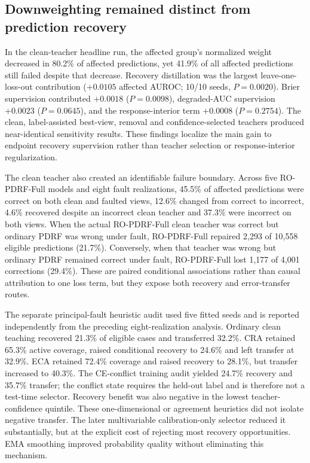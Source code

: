 \documentclass[11pt]{article}
\begin{document}
\subsection{Downweighting remained distinct from prediction recovery}

In the clean-teacher headline run, the affected group's normalized weight decreased in 80.2\% of affected predictions, yet 41.9\% of all affected predictions still failed despite that decrease. Recovery distillation was the largest leave-one-loss-out contribution ($+0.0105$ affected AUROC; 10/10 seeds, $P=0.0020$). Brier supervision contributed $+0.0018$ ($P=0.0098$), degraded-AUC supervision $+0.0023$ ($P=0.0645$), and the response-interior term $+0.0008$ ($P=0.2754$). The clean, label-assisted best-view, removal and confidence-selected teachers produced near-identical sensitivity results. These findings localize the main gain to endpoint recovery supervision rather than teacher selection or response-interior regularization.

The clean teacher also created an identifiable failure boundary. Across five RO-PDRF-Full models and eight fault realizations, 45.5\% of affected predictions were correct on both clean and faulted views, 12.6\% changed from correct to incorrect, 4.6\% recovered despite an incorrect clean teacher and 37.3\% were incorrect on both views. When the actual RO-PDRF-Full clean teacher was correct but ordinary PDRF was wrong under fault, RO-PDRF-Full repaired 2,293 of 10,558 eligible predictions (21.7\%). Conversely, when that teacher was wrong but ordinary PDRF remained correct under fault, RO-PDRF-Full lost 1,177 of 4,001 corrections (29.4\%). These are paired conditional associations rather than causal attribution to one loss term, but they expose both recovery and error-transfer routes.

The separate principal-fault heuristic audit used five fitted seeds and is reported independently from the preceding eight-realization analysis. Ordinary clean teaching recovered 21.3\% of eligible cases and transferred 32.2\%. CRA retained 65.3\% active coverage, raised conditional recovery to 24.6\% and left transfer at 32.9\%. ECA retained 72.4\% coverage and raised recovery to 28.1\%, but transfer increased to 40.3\%. The CE-conflict training audit yielded 24.7\% recovery and 35.7\% transfer; the conflict state requires the held-out label and is therefore not a test-time selector. Recovery benefit was also negative in the lowest teacher-confidence quintile. These one-dimensional or agreement heuristics did not isolate negative transfer. The later multivariable calibration-only selector reduced it substantially, but at the explicit cost of rejecting most recovery opportunities. EMA smoothing improved probability quality without eliminating this mechanism.
\end{document}
